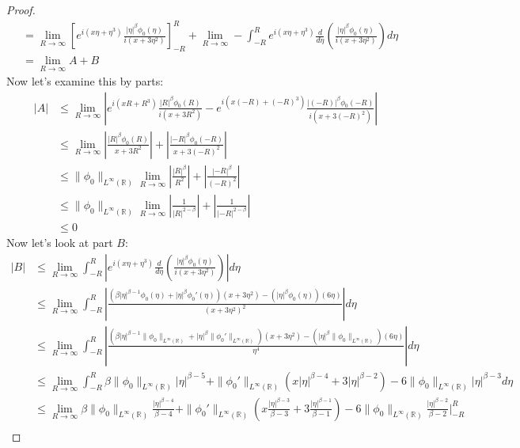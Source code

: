 \begin{proof}{}
\begin{align*}
    &=\lim_{R\rightarrow \infty}\left[ e^{i(x\eta+\eta^3)}\frac{|\eta|^{\beta}\phi_0(\eta)}{i(x+3\eta^2)} \right]_{-R}^{R}+ \lim_{R\rightarrow \infty} -\int_{-R}^{R}e^{i(x\eta+\eta^3)}\frac{d}{d\eta}\left( \frac{|\eta|^{\beta}\phi_0(\eta)}{i(x+3\eta^{2})} \right)d\eta\\
    &=\lim_{R\rightarrow \infty} A + B
  \end{align*}
  Now let’s examine this by parts:
  \begin{align*}
    |A|&\leq \lim_{R\rightarrow \infty}\left| e^{i(xR+R^3)}\frac{|R|^{\beta}\phi_0(R)}{i(x+3R^2)} - e^{i(x(-R)+(-R)^3)}\frac{|(-R)|^{\beta}\phi_0(-R)}{i(x+3(-R)^2)} \right|\\
    &\leq \lim_{R\rightarrow\infty} \left| \frac{|R|^{\beta}\phi_0(R)}{x+3R^2} \right| + \left| \frac{|-R|^{\beta}\phi_0(-R)}{x+3(-R)^2} \right|\\
    &\leq \|\phi_0\|_{L^{\infty}(\mathbb{R})}\lim_{R\rightarrow\infty} \left| \frac{|R|^{\beta}}{R^2} \right| + \left| \frac{|-R|^{\beta}}{(-R)^2} \right|\\
    &\leq \|\phi_0\|_{L^{\infty}(\mathbb{R})}\lim_{R\rightarrow\infty} \left| \frac{1}{|R|^{2-\beta}} \right| + \left| \frac{1}{|-R|^{2-\beta}} \right|\\
    &\leq 0
  \end{align*}
  Now let’s look at part $B$:
  \begin{align*}
    |B|&\leq \lim_{R\rightarrow \infty}\int_{-R}^{R}\left| e^{i(x\eta+\eta^3)}\frac{d}{d\eta}\left( \frac{|\eta|^{\beta}\phi_0(\eta)}{i(x+3\eta^2)} \right) \right|d\eta\\
    &\leq \lim_{R\rightarrow\infty}\int_{-R}^{R}\left| \frac{(\beta|\eta|^{\beta-1}\phi_0(\eta)+|\eta|^{\beta}\phi_0'(\eta))(x+3\eta^2)-(|\eta|^{\beta}\phi_0(\eta))(6\eta)}{(x+3\eta^2)^2} \right|d\eta\\
    &\leq \lim_{R\rightarrow\infty}\int_{-R}^{R}\left| \frac{(\beta|\eta|^{\beta-1}\|\phi_0\|_{L^{\infty}(\mathbb{R})}+|\eta|^{\beta}\|\phi_0'\|_{L^{\infty}(\mathbb{R})})(x+3\eta^2)-(|\eta|^{\beta}\|\phi_0\|_{L^{\infty}(\mathbb{R})})(6\eta)}{\eta^4} \right|d\eta\\
    &\leq \lim_{R\rightarrow \infty}\int_{-R}^{R} \beta\|\phi_0\|_{L^{\infty}(\mathbb{R})}|\eta|^{\beta-5}+\|\phi_0'\|_{L^{\infty}(\mathbb{R})}(x|\eta|^{\beta-4}+3|\eta|^{\beta-2})-6\|\phi_0\|_{L^{\infty}(\mathbb{R})}|\eta|^{\beta-3}d\eta\\
    &\leq \lim_{R\rightarrow \infty} \beta\|\phi_0\|_{L^{\infty}(\mathbb{R})}\frac{|\eta|^{\beta-4}}{\beta-4}+\|\phi_0'\|_{L^{\infty}(\mathbb{R})}\left(x\frac{|\eta|^{\beta-3}}{\beta-3}+3\frac{|\eta|^{\beta-1}}{\beta-1}\right)-6\|\phi_0\|_{L^{\infty}(\mathbb{R})}\frac{|\eta|^{\beta-2}}{\beta-2}\Bigg|_{-R}^{R}\\

\end{align*}
\end{proof}
